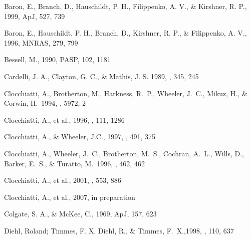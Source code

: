 
Baron, E., Branch, D., Hauschildt, P. H., Filippenko, A. V., \& Kirshner, R. P., 1999, ApJ, 527, 739

Baron, E., Hauschildt, P. H., Branch, D., Kirshner, R. P., \& Filippenko, A. V., 1996, MNRAS, 279, 799

 Bessell, M., 1990, PASP, 102, 1181



 Cardelli, J. A., Clayton, G. C., \& Mathis, J. S. 1989, \apj, 345, 245
 
 Clocchiatti, A., 
Brotherton, M., Harkness, R.~P., Wheeler, J.~C., Mikuz, H., \& Corwin, H.\ 
1994, \iaucirc, 5972, 2 
 
 Clocchiatti, A.,
et al., 1996, \aj, 111, 1286

  Clocchiatti, A., \& Wheeler, J.C., 1997, \apj, 491, 375
 
 Clocchiatti, A., 
Wheeler, J.~C., Brotherton, M.~S., Cochran, A.~L., Wills, D., Barker, 
E.~S., \& Turatto, M.\ 1996, \apj, 462, 462
 
 Clocchiatti, A., et al., 2001, \apj, 553, 886
 
 Clocchiatti, A., et al., 2007, in preparation

 Colgate, S. A., \& McKee, C., 1969, ApJ, 157, 623 %

Diehl, Roland; Timmes, F. X.
 Diehl, R., \& Timmes, F.~X.,1998, \pasp, 110, 637

